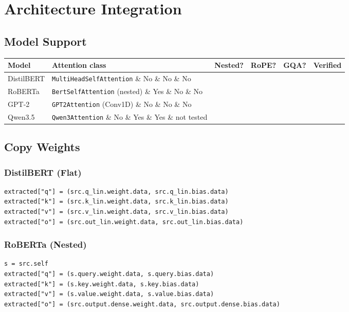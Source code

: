 
\section{Architecture Integration}

\subsection{Model Support}

\begin{table}[H]
\centering
\small
\begin{tabular}{llllll}
\toprule
\textbf{Model} & \textbf{Attention class} & \textbf{Nested?} & \textbf{RoPE?} & \textbf{GQA?} & \textbf{Verified} \\
\midrule
DistilBERT & \texttt{MultiHeadSelfAttention} \& No \& No \& No &  \\
RoBERTa & \texttt{BertSelfAttention} (nested) \& Yes \& No \& No &  \\
GPT-2 & \texttt{GPT2Attention} (Conv1D) \& No \& No \& No &  \\
Qwen3.5 & \texttt{Qwen3Attention} \& No \& Yes \& Yes \& not tested \\
\bottomrule
\end{tabular}
\end{table}

\subsection{Copy Weights}

\subsubsection{DistilBERT (Flat)}

\begin{lstlisting}
extracted["q"] = (src.q_lin.weight.data, src.q_lin.bias.data)
extracted["k"] = (src.k_lin.weight.data, src.k_lin.bias.data)
extracted["v"] = (src.v_lin.weight.data, src.v_lin.bias.data)
extracted["o"] = (src.out_lin.weight.data, src.out_lin.bias.data)
\end{lstlisting}

\subsubsection{RoBERTa (Nested)}

\begin{lstlisting}
s = src.self
extracted["q"] = (s.query.weight.data, s.query.bias.data)
extracted["k"] = (s.key.weight.data, s.key.bias.data)
extracted["v"] = (s.value.weight.data, s.value.bias.data)
extracted["o"] = (src.output.dense.weight.data, src.output.dense.bias.data)
\end{lstlisting}

